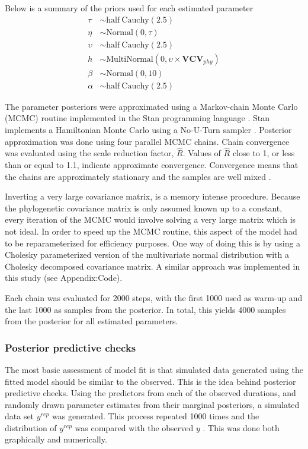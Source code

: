 \documentclass[12pt,letterpaper]{article}
\begin{document}
Below is a summary of the priors used for each estimated parameter 
\begin{align*}
  \tau &\sim \mathrm{half\ Cauchy}(2.5) \\
  \eta &\sim \mathrm{Normal}(0, \tau) \\
  \upsilon &\sim \mathrm{half\ Cauchy}(2.5) \\
  h &\sim \mathrm{MultiNormal}(0, \upsilon \times \mathbf{VCV}_{phy}) \\
  \beta &\sim \mathrm{Normal}(0, 10) \\
  \alpha &\sim \mathrm{half\ Cauchy}(2.5)
\end{align*}


The parameter posteriors were approximated using a Markov-chain Monte Carlo (MCMC) routine implemented in the Stan programming language \citep{2014stan}. Stan implements a Hamiltonian Monte Carlo using a No-U-Turn sampler \citep{Hoffman-Gelman:2011}. Posterior approximation was done using four parallel MCMC chains. Chain convergence was evaluated using the scale reduction factor, \(\hat{R}\). Values of \(\hat{R}\) close to 1, or less than or equal to 1.1, indicate approximate convergence. Convergence means that the chains are approximately stationary and the samples are well mixed \citep{Gelman2013d}.

Inverting a very large covariance matrix, is a memory intense procedure. Because the phylogenetic covariance matrix is only assumed known up to a constant, every iteration of the MCMC would involve solving a very large matrix which is not ideal. In order to speed up the MCMC routine, this aspect of the model had to be reparameterized for efficiency purposes. One way of doing this is by using a Cholesky parameterized version of the multivariate normal distribution with a Cholesky decomposed covariance matrix. A similar approach was implemented in this study (see Appendix:Code).

Each chain was evaluated for 2000 steps, with the first 1000 used as warm-up and the last 1000 as samples from the posterior. In total, this yields 4000 samples from the posterior for all estimated parameters. 


\subsubsection{Posterior predictive checks}

The most basic assessment of model fit is that simulated data generated using the fitted model should be similar to the observed. This is the idea behind posterior predictive checks. Using the predictors from each of the observed durations, and randomly drawn parameter estimates from their marginal posteriors, a simulated data set \(y^{rep}\) was generated. This process repeated 1000 times and the distribution of \(y^{rep}\) was compared with the observed \(y\) \citep{Gelman2013d}. This was done both graphically and numerically.
\end{document}
